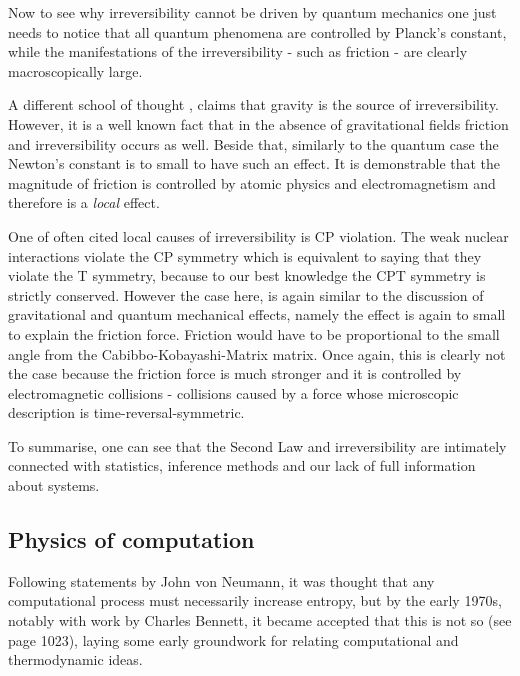 \documentclass[a4paper,12pt]{article}
\begin{document}
Now to see why irreversibility cannot be driven by quantum mechanics one just needs to notice that all quantum phenomena are controlled by Planck's constant, while the manifestations of the irreversibility - such as friction - are clearly macroscopically large. %

A different school of thought \cite{KIEFER2005}\cite{Barbour:2014hq}, %
claims that gravity is the source of irreversibility. However, it is a well known fact that in the absence of gravitational fields friction and irreversibility occurs as well. Beside that, similarly to the quantum case the Newton's constant is to small to have such an effect. It is demonstrable that the magnitude of friction is controlled by atomic physics and electromagnetism and therefore is a \textit{local} effect. 

One of often cited local causes of irreversibility is CP violation. %
The weak nuclear interactions violate the CP symmetry which is equivalent to saying that they violate the T symmetry, because to our best knowledge the CPT symmetry is strictly conserved. However the case here, is again similar to the discussion of gravitational and quantum mechanical effects, namely the effect is again to small to explain the friction force. Friction would have to be proportional to the small angle from the Cabibbo-Kobayashi-Matrix matrix.
Once again, this is clearly not the case because the friction force is much stronger and it is controlled by electromagnetic collisions - collisions caused by a force whose microscopic description is time-reversal-symmetric.
 
To summarise, one can see that the Second Law and irreversibility are intimately connected with statistics, inference methods and our lack of full information about systems.

\subsection{Physics of computation}

Following statements by John von Neumann, it was thought that any computational process must necessarily increase entropy,  but by the early 1970s, notably with work by Charles Bennett, it became accepted that this is not so (see page 1023), laying some early groundwork for relating computational and thermodynamic ideas. 
\end{document}
